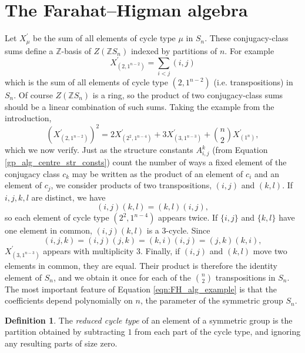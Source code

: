 \documentclass[10pt]{article}
\theoremstyle{definition}
\newtheorem{definition}[theorem]{Definition}
\begin{document}
\section{The Farahat--Higman algebra} \label{FH_theory_section}

Let $X_{\mu}^\prime$ be the sum of all elements of cycle type $\mu$ in $S_n$. These conjugacy-class sums define a $\mathbb{Z}$-basis of $Z(\mathbb{Z}S_n)$ indexed by partitions of $n$. For example
\[
X_{(2,1^{n-2})}^\prime = \sum_{i<j} (i,j)
\]
which is the sum of all elements of cycle type $(2,1^{n-2})$ (i.e. transpositions) in $S_n$. Of course $Z(\mathbb{Z}S_n)$ is a ring, so the product of two conjugacy-class sums should be a linear combination of such sums. Taking the example from the introduction,
\begin{equation} \label{eqn:FH_alg_example}
(X_{(2,1^{n-2})}^\prime)^2 = 2X_{(2^2,1^{n-4})}^\prime + 3X_{(3,1^{n-3})}^\prime + \binom{n}{2}X_{(1^{n})}^\prime,
\end{equation}
which we now verify. Just as the structure constants $A_{i,j}^k$ (from Equation \eqref{gp_alg_centre_str_consts}) count the number of ways a fixed element of the conjugacy class $c_k$ may be written as the product of an element of $c_i$ and an element of $c_j$, we consider products of two transpositions, $(i,j)$ and $(k,l)$. 
If $i,j,k,l$ are distinct, we have
\[
(i,j)(k,l) = (k,l)(i,j),
\]
so each element of cycle type $(2^2,1^{n-4})$ appears twice. If $\{i,j\}$ and $\{k,l\}$ have one element in common, $(i,j)(k,l)$ is a 3-cycle. Since
\[
(i,j,k) = (i,j)(j,k) = (k,i)(i,j) = (j,k)(k,i),
\]
$X_{(3,1^{n-3})}^\prime$ appears with multiplicity 3. Finally, if $(i,j)$ and $(k,l)$ move two elements in common, they are equal. 
Their product is therefore the identity element of $S_n$, and we obtain it once for each of the $\binom{n}{2}$ transpositions in $S_n$. The most important feature of Equation \eqref{eqn:FH_alg_example} is that the coefficients depend polynomially on $n$, the parameter of the symmetric group $S_n$. 
\begin{definition}
The \emph{reduced cycle type} of an element of a symmetric group is the partition obtained by subtracting $1$ from each part of the cycle type, and ignoring any resulting parts of size zero. 
\end{definition}
\end{document}
